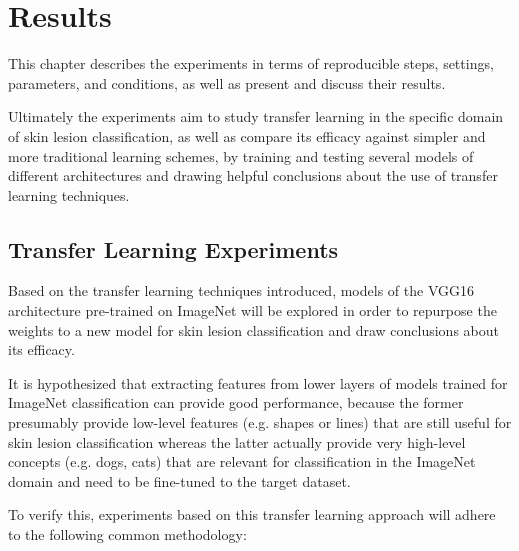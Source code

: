 \chapter{Results}
\label{chapter:results}

This chapter describes the experiments in terms of reproducible steps, settings, parameters, and conditions, as well as present and discuss their results.

Ultimately the experiments aim to study transfer learning in the specific domain of skin lesion classification, as well as compare its efficacy against simpler and more traditional learning schemes, by training and testing several models of different architectures and drawing helpful conclusions about the use of transfer learning techniques.

\section{Transfer Learning Experiments}

Based on the transfer learning techniques introduced, models of the VGG16 architecture pre-trained on ImageNet will be explored in order to repurpose the weights to a new model for skin lesion classification and draw conclusions about its efficacy.

It is hypothesized that extracting features from lower layers of models trained for ImageNet classification can provide good performance, because the former presumably provide low-level features (e.g. shapes or lines) that are still useful for skin lesion classification whereas the latter actually provide very high-level concepts (e.g. dogs, cats) that are relevant for classification in the ImageNet domain and need to be fine-tuned to the target dataset.

To verify this, experiments based on this transfer learning approach will adhere to the following common methodology:

